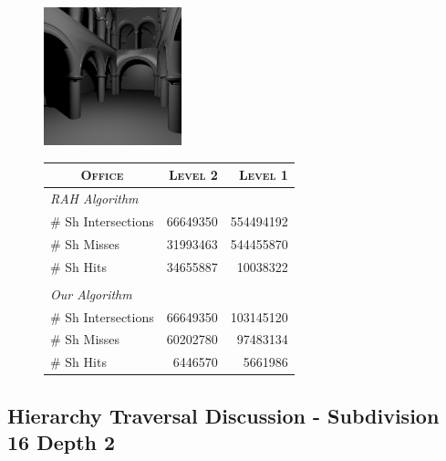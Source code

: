 \begin{figure}[!htb]
    \begin{minipage}{0.25\linewidth}
        \centering
        \includegraphics[width=4.0cm]{Images/Sponza_Preview}
    \end{minipage}
    \begin{minipage}{0.725\linewidth}
        \centering
        \fontsize{8}{10}
        \selectfont
        \begin{tabular}[h]{l|rr}
            \multicolumn{1}{c|}{\textsc{Office}} & \textsc{Level 2} & \textsc{Level 1}\\
            \hline
            \emph{RAH Algorithm} & & \\
            \hline
            \quad \# Sh Intersections   & 66649350	& 554494192	\\
            \quad \# Sh Misses          & 31993463	& 544455870	\\
            \quad \# Sh Hits            & 34655887	& 10038322	\\
            & & \\
            \hline
            \emph{Our Algorithm} & & \\
            \hline
            \quad \# Sh Intersections   & 66649350	& 103145120	\\
            \quad \# Sh Misses          & 60202780	& 97483134	\\
            \quad \# Sh Hits            & 6446570	& 5661986	\\
        \end{tabular}
        \label{table:sponza-d16-n2-results}
    \end{minipage}
\end{figure}

\subsection{Hierarchy Traversal Discussion - Subdivision 16 Depth 2}

